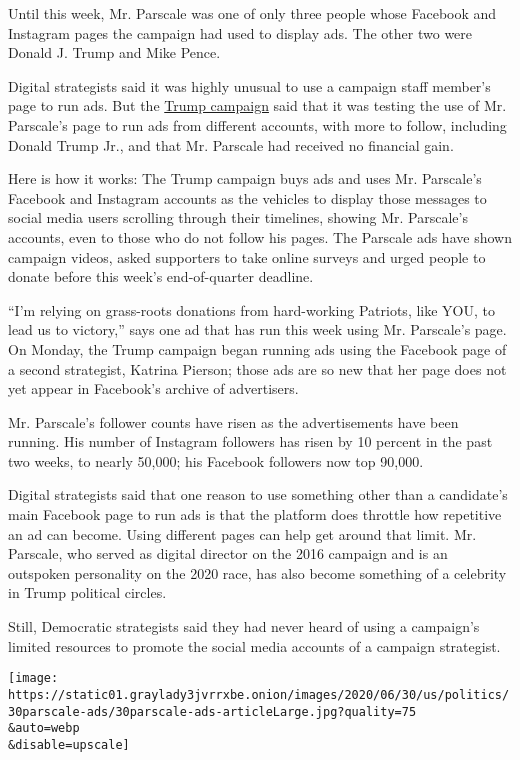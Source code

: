 Until this week, Mr. Parscale was one of only three people whose
Facebook and Instagram pages the campaign had used to display ads. The
other two were Donald J. Trump and Mike Pence.

Digital strategists said it was highly unusual to use a campaign staff
member's page to run ads. But the
\href{https://www.nytimes3xbfgragh.onion/2020/07/01/us/politics/trump-fundraising-2020.html}{Trump
campaign} said that it was testing the use of Mr. Parscale's page to run
ads from different accounts, with more to follow, including Donald Trump
Jr., and that Mr. Parscale had received no financial gain.

Here is how it works: The Trump campaign buys ads and uses Mr.
Parscale's Facebook and Instagram accounts as the vehicles to display
those messages to social media users scrolling through their timelines,
showing Mr. Parscale's accounts, even to those who do not follow his
pages. The Parscale ads have shown campaign videos, asked supporters to
take online surveys and urged people to donate before this week's
end-of-quarter deadline.

``I'm relying on grass-roots donations from hard-working Patriots, like
YOU, to lead us to victory,'' says one ad that has run this week using
Mr. Parscale's page. On Monday, the Trump campaign began running ads
using the Facebook page of a second strategist, Katrina Pierson; those
ads are so new that her page does not yet appear in Facebook's archive
of advertisers.

Mr. Parscale's follower counts have risen as the advertisements have
been running. His number of Instagram followers has risen by 10 percent
in the past two weeks, to nearly 50,000; his Facebook followers now top
90,000.

Digital strategists said that one reason to use something other than a
candidate's main Facebook page to run ads is that the platform does
throttle how repetitive an ad can become. Using different pages can help
get around that limit. Mr. Parscale, who served as digital director on
the 2016 campaign and is an outspoken personality on the 2020 race, has
also become something of a celebrity in Trump political circles.

Still, Democratic strategists said they had never heard of using a
campaign's limited resources to promote the social media accounts of a
campaign strategist.

\texttt{[image: https://static01.graylady3jvrrxbe.onion/images/2020/06/30/us/politics/30parscale-ads/30parscale-ads-articleLarge.jpg?quality=75\\\&auto=webp\\\&disable=upscale]}

